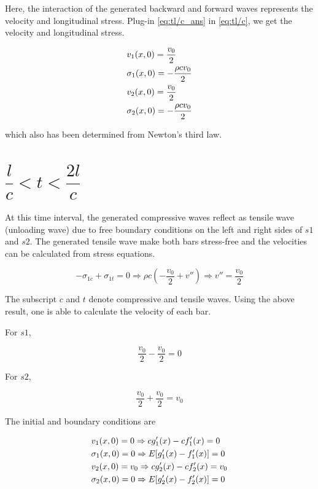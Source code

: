 \documentclass{article}
\begin{document}
Here, the interaction of the generated backward and forward waves represents the velocity and longitudinal stress. Plug-in \cref{eq:tl/c_ans} in \cref{eq:tl/c}, we get the velocity and longitudinal stress.

\begin{align}
    & v_1(x, 0) = \frac{v_0}{2} \notag\\
    & \sigma_1(x, 0) = -\frac{\rho c v_0}{2} \notag\\
    & v_2(x, 0) = \frac{v_0}{2} \notag\\
    & \sigma_2(x, 0) = -\frac{\rho c v_0}{2} 
    \label{eq:tl/c_result}
\end{align}

which also has been determined from Newton's third law.

\section{$ \dfrac{l}{c} < t < \dfrac{2l}{c}$}
At this time interval, the generated compressive waves reflect as tensile wave (unloading wave) due to free boundary conditions on the left and right sides of $s1$ and $s2$. The generated tensile wave make both bars stress-free and the velocities can be calculated from stress equations.

\begin{equation*}
    -\sigma_{1c} + \sigma_{1t} = 0 \Rightarrow \rho c \left( -\frac{v_0}{2} + v'' \right) \Rightarrow v'' = \frac{v_0}{2}
\end{equation*}

The subscript $c$ and $t$ denote compressive and tensile waves. Using the above result, one is able to calculate the velocity of each bar.

For $s1$,

\begin{equation*}
    \frac{v_0}{2} - \frac{v_0}{2} = 0
\end{equation*}

For $s2$,

\begin{equation*}
    \frac{v_0}{2} + \frac{v_0}{2} = v_0
\end{equation*}

The initial and boundary conditions are

\begin{align}
    & v_1(x, 0) = 0 \Rightarrow c g_1'(x) - c f_1'(x) = 0 \notag\\
    & \sigma_1(x, 0) = 0 \Rightarrow E [g_1'(x) - f_1'(x)] = 0 \notag\\
    & v_2(x, 0) = v_0 \Rightarrow c g_2'(x) - c f_2'(x) = v_0 \notag\\
    & \sigma_2(x, 0) = 0 \Rightarrow E [g_2'(x) - f_2'(x)] = 0
    \label{eq:t2l/c}
\end{align}
\end{document}
